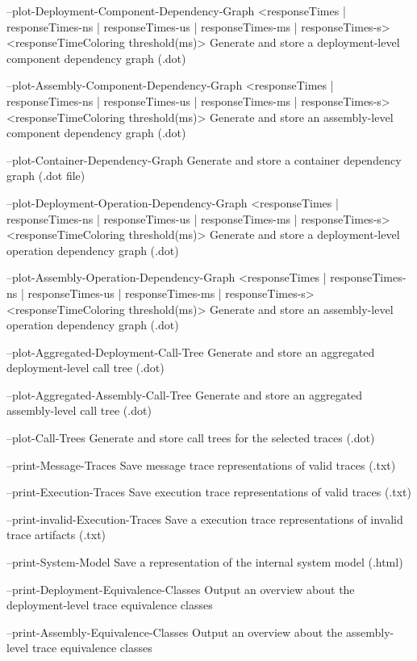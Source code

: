     --plot-Deployment-Component-Dependency-Graph <responseTimes | responseTimes-ns | responseTimes-us | responseTimes-ms | responseTimes-s> <responseTimeColoring threshold(ms)>
        Generate and store a deployment-level component dependency graph
        (.dot)

    --plot-Assembly-Component-Dependency-Graph <responseTimes | responseTimes-ns | responseTimes-us | responseTimes-ms | responseTimes-s> <responseTimeColoring threshold(ms)>
        Generate and store an assembly-level component dependency graph
        (.dot)

    --plot-Container-Dependency-Graph
        Generate and store a container dependency graph (.dot file)

    --plot-Deployment-Operation-Dependency-Graph <responseTimes | responseTimes-ns | responseTimes-us | responseTimes-ms | responseTimes-s> <responseTimeColoring threshold(ms)>
        Generate and store a deployment-level operation dependency graph
        (.dot)

    --plot-Assembly-Operation-Dependency-Graph <responseTimes | responseTimes-ns | responseTimes-us | responseTimes-ms | responseTimes-s> <responseTimeColoring threshold(ms)>
        Generate and store an assembly-level operation dependency graph
        (.dot)

    --plot-Aggregated-Deployment-Call-Tree
        Generate and store an aggregated deployment-level call tree (.dot)

    --plot-Aggregated-Assembly-Call-Tree
        Generate and store an aggregated assembly-level call tree (.dot)

    --plot-Call-Trees
        Generate and store call trees for the selected traces (.dot)

    --print-Message-Traces
        Save message trace representations of valid traces (.txt)

    --print-Execution-Traces
        Save execution trace representations of valid traces (.txt)

    --print-invalid-Execution-Traces
        Save a execution trace representations of invalid trace artifacts
        (.txt)

    --print-System-Model
        Save a representation of the internal system model (.html)

    --print-Deployment-Equivalence-Classes
        Output an overview about the deployment-level trace equivalence
        classes

    --print-Assembly-Equivalence-Classes
        Output an overview about the assembly-level trace equivalence
        classes

